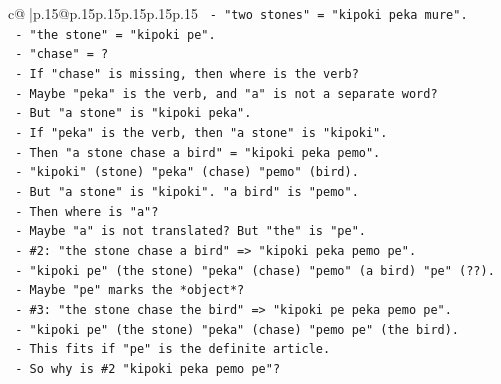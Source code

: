 \documentclass{article}
\begin{document}
{\begin{supertabular}{c@{$\;$}|p{.15\linewidth}@{}p{.15\linewidth}p{.15\linewidth}p{.15\linewidth}p{.15\linewidth}p{.15\linewidth}}
{{{\texttt{                                        {-} "two stones" = "kipoki peka mure".} \\
\texttt{                                        {-} "the stone" = "kipoki pe".} \\
\texttt{                                        {-} "chase" = ?} \\
\texttt{                                        {-} If "chase" is missing, then where is the verb?} \\
\texttt{                                        {-} Maybe "peka" is the verb, and "a" is not a separate word?} \\
\texttt{                                        {-} But "a stone" is "kipoki peka".} \\
\texttt{                                        {-} If "peka" is the verb, then "a stone" is "kipoki".} \\
\texttt{                                        {-} Then "a stone chase a bird" = "kipoki peka pemo".} \\
\texttt{                                        {-} "kipoki" (stone) "peka" (chase) "pemo" (bird).} \\
\texttt{                                        {-} But "a stone" is "kipoki". "a bird" is "pemo".} \\
\texttt{                                        {-} Then where is "a"?} \\
\texttt{                                        {-} Maybe "a" is not translated? But "the" is "pe".} \\
\texttt{                                        {-} \#2: "the stone chase a bird" => "kipoki peka pemo pe".} \\
\texttt{                                          {-} "kipoki pe" (the stone) "peka" (chase) "pemo" (a bird) "pe" (??).} \\
\texttt{                                          {-} Maybe "pe" marks the *object*?} \\
\texttt{                                          {-} \#3: "the stone chase the bird" => "kipoki pe peka pemo pe".} \\
\texttt{                                            {-} "kipoki pe" (the stone) "peka" (chase) "pemo pe" (the bird).} \\
\texttt{                                            {-} This fits if "pe" is the definite article.} \\
\texttt{                                            {-} So why is \#2 "kipoki peka pemo pe"?} \\
}}}
\end{supertabular}}
\end{document}

